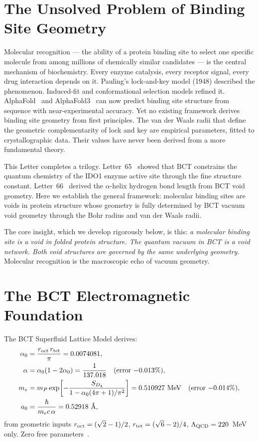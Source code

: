 \documentclass[aps,prl,preprint,superscriptaddress,floatfix]{revtex4-2}
\begin{document}
\section{The Unsolved Problem of Binding Site Geometry}

Molecular recognition --- the ability of a protein binding site to
select one specific molecule from among millions of chemically similar
candidates --- is the central mechanism of biochemistry. Every enzyme
catalysis, every receptor signal, every drug interaction depends on it.
Pauling's lock-and-key model (1948) described the phenomenon. Induced-fit
and conformational selection models refined it. AlphaFold~\cite{jumper2021}
and AlphaFold3~\cite{alphafold3} can now predict binding site structure
from sequence with near-experimental accuracy. Yet no existing framework
derives binding site geometry from first principles. The van der Waals
radii that define the geometric complementarity of lock and key are
empirical parameters, fitted to crystallographic data. Their values have
never been derived from a more fundamental theory.

This Letter completes a trilogy. Letter~65~\cite{bct65} showed that BCT
constrains the quantum chemistry of the IDO1 enzyme active site through
the fine structure constant. Letter~66~\cite{bct66} derived the
$\alpha$-helix hydrogen bond length from BCT void geometry. Here we
establish the general framework: molecular binding sites are voids in
protein structure whose geometry is fully determined by BCT vacuum
void geometry through the Bohr radius and van der Waals radii.

The core insight, which we develop rigorously below, is this:
\textit{a molecular binding site is a void in folded protein structure.
The quantum vacuum in BCT is a void network. Both void structures are
governed by the same underlying geometry.} Molecular recognition is
the macroscopic echo of vacuum geometry.

\section{The BCT Electromagnetic Foundation}

The BCT Superfluid Lattice Model derives:
\begin{align}
\alpha_0 &= \frac{r_{\rm oct}\,r_{\rm tet}}{\pi} = 0.0074081,\\
\alpha &= \alpha_0(1-2\alpha_0) = \frac{1}{137.018}
  \quad(\text{error } {-0.013\%}),\\
m_e &= m_P\exp\!\left[-\frac{S_{D_4}}{1-\alpha_0(4\pi+1)/\pi^2}\right]
  = 0.510927~\text{MeV}
  \quad(\text{error } {-0.014\%}),\\
a_0 &= \frac{\hbar}{m_e c\,\alpha} = 0.52918~\text{\AA},
\end{align}
from geometric inputs $r_{\rm oct} = (\sqrt{2}-1)/2$,
$r_{\rm tet} = (\sqrt{6}-2)/4$, $\Lambda_{\rm QCD} = 220$~MeV only.
Zero free parameters~\cite{prl,monograph}.
\end{document}
